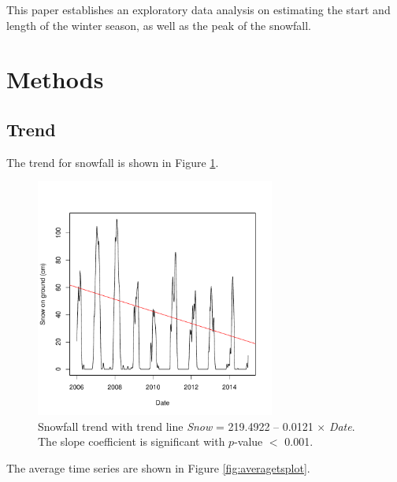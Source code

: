 \documentclass[12pt,twoside]{article}
\begin{document}
{This paper establishes an exploratory data analysis on estimating the start and length of the winter season, as well as the peak of the snowfall. 


\section{Methods}

\subsection{Trend}

The trend for snowfall is shown in Figure \ref{fig:snowtrend}.


\begin{figure}[!ht]
\begin{center}
\includegraphics[width=0.7\textwidth]{report-snowtrend}
\end{center}
\caption{Snowfall trend with trend line \textsl{Snow} = 219.4922 -- 0.0121 $\times$ \textsl{Date}. The slope coefficient is significant with $p$-value $<$ 0.001.}
\label{fig:snowtrend}
\end{figure}

The average time series are shown in Figure \ref{fig:averagetsplot}. \lipsum[3]


}
\end{document}

